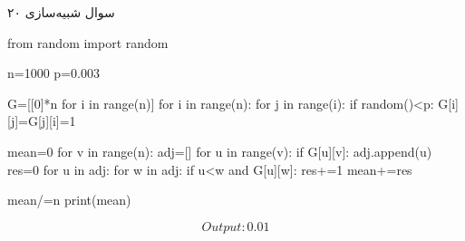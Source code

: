 سوال شبیه‌سازی ۲۰

\begin{latin}
\begin{python}
from random import random

n=1000
p=0.003

G=[[0]*n for i in range(n)]
for i in range(n):
	for j in range(i):
		if random()<p:
			G[i][j]=G[j][i]=1

mean=0
for v in range(n):
	adj=[]
	for u in range(v):
		if G[u][v]:
			adj.append(u)
	res=0
	for u in adj:
		for w in adj:
			if u<w and G[u][w]:
				res+=1
	mean+=res

mean/=n
print(mean)
\end{python}
\end{latin}

$$
Output: 0.01
$$